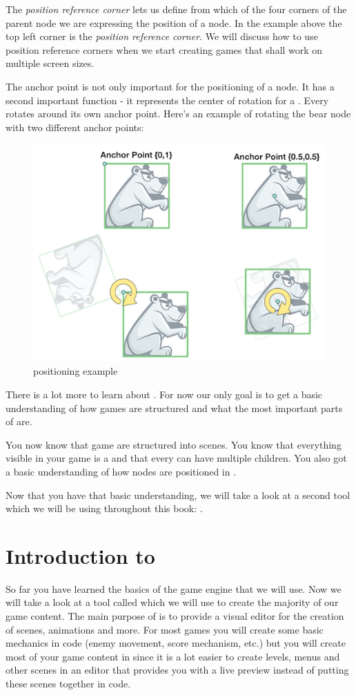 The \textit{position reference
corner} lets us define from which of the four corners of the parent node we are
expressing the position of a node. In the example above the top left corner is
the \textit{position reference corner}. We will discuss how to use position reference corners when we start 
creating games that shall work on multiple screen sizes.

The anchor point is not only important for the positioning of a node. It has a
second important function - it represents the center of rotation for a
\ccnode{}. Every \ccnode{} rotates around its own anchor point. Here's an
example of rotating the bear node with two different anchor points:

\begin{figure}[H]
		\centering
		\includegraphics[width=0.6\linewidth]{images/cocos2d/ccnode/Rotation.png}     
		\caption{\ccnode{} positioning example}
\end{figure}

There is a lot more to learn about \ccnode{}. For now our only goal is to
get a basic understanding of how \cocos{} games are structured and what the most
important parts of \cocos{} are.

You now know that \cocos{} game are structured into scenes. You know that
everything visible in your game is a \ccnode{} and that every \ccnode{} can have
multiple children. You also got a basic understanding of how nodes are
positioned in \cocos{}.

Now that you have that basic understanding, we will take a look at a second tool which we will be using throughout this book: \SB{}.

\section{Introduction to \SB{}}
So far you have learned the basics of the game engine that we will use. Now we
will take a look at a tool called \SB{} which we will use to create the majority of
our game content. The main purpose of \SB{} is to provide a visual editor for
the creation of scenes, animations and more. For most games you will create some
basic mechanics in code (enemy movement, score mechanism, etc.) but you will create
 most of your game content in \SB{} since it is a lot easier to create
levels, menus and other scenes in an editor that provides you with a live
preview instead of putting these scenes together in code.

